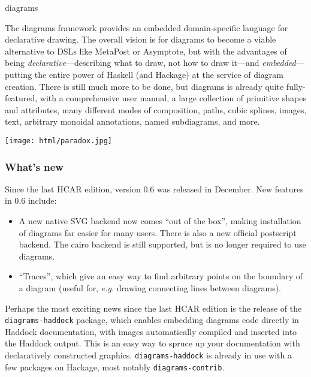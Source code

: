 \begin{hcarentry}[updated]{diagrams}
\makeheader

The diagrams framework provides an embedded domain-specific language
for declarative drawing.  The overall vision is for diagrams to become
a viable alternative to DSLs like MetaPost or Asymptote, but with the
advantages of being \emph{declarative}---describing what to draw, not
how to draw it---and \emph{embedded}---putting the entire power of
Haskell (and Hackage) at the service of diagram creation.  There is
still much more to be done, but diagrams is already quite
fully-featured, with a comprehensive user manual, a large collection
of primitive shapes and attributes, many different modes of
composition, paths, cubic splines, images, text, arbitrary monoidal
annotations, named subdiagrams, and more.

\begin{center}
\texttt{[image: html/paradox.jpg]}
\end{center}

\subsubsection*{What's new}

Since the last HCAR edition, version 0.6 was released in December.
New features in 0.6 include:
\begin{itemize}
\item A new native SVG backend now comes ``out of the box'', making
  installation of diagrams far easier for many users.  There is also a
  new official postscript backend.  The cairo backend is still
  supported, but is no longer required to use diagrams.
\item ``Traces'', which give an easy way to find arbitrary points on
  the boundary of a diagram (useful for, \emph{e.g.} drawing
  connecting lines between diagrams).
\end{itemize}

Perhaps the most exciting news since the last HCAR edition is the
release of the \texttt{diagrams-haddock} package, which enables
embedding diagrams code directly in Haddock documentation, with images
automatically compiled and inserted into the Haddock output.  This is
an easy way to spruce up your documentation with declaratively
constructed graphics.  \texttt{diagrams-haddock} is already in use
with a few packages on Hackage, most notably \texttt{diagrams-contrib}.


\end{hcarentry}
